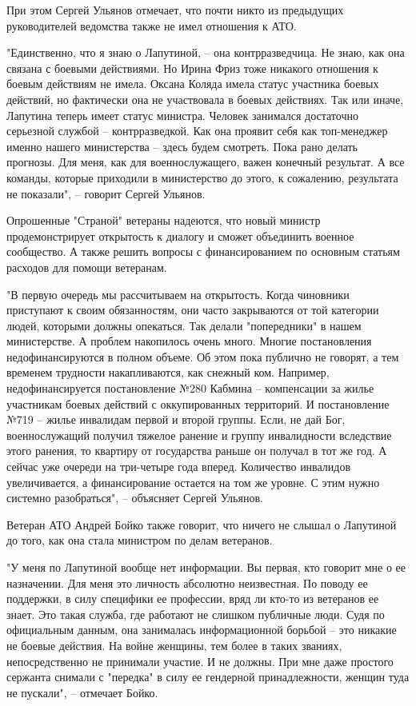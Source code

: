 При этом Сергей Ульянов отмечает, что почти никто из предыдущих руководителей
ведомства также не имел отношения к АТО.

"Единственно, что я знаю о Лапутиной, – она контрразведчица. Не знаю, как она
связана с боевыми действиями. Но Ирина Фриз тоже никакого отношения к боевым
действиям не имела. Оксана Коляда имела статус участника боевых действий, но
фактически она не участвовала в боевых действиях. Так или иначе, Лапутина
теперь имеет статус министра. Человек занимался достаточно серьезной службой –
контрразведкой. Как она проявит себя как топ-менеджер именно нашего
министерства – здесь будем смотреть. Пока рано делать прогнозы. Для меня, как
для военнослужащего, важен конечный результат. А все команды, которые приходили
в министерство до этого, к сожалению, результата не показали", – говорит Сергей
Ульянов.

Опрошенные "Страной" ветераны надеются, что новый министр продемонстрирует
открытость к диалогу и сможет объединить военное сообщество. А также решить
вопросы с финансированием по основным статьям расходов для помощи ветеранам.

"В первую очередь мы рассчитываем на открытость. Когда чиновники приступают к
своим обязанностям, они часто закрываются от той категории людей, которыми
должны опекаться. Так делали "попередники" в нашем министерстве. А проблем
накопилось очень много. Многие постановления недофинансируются в полном объеме.
Об этом пока публично не говорят, а тем временем трудности накапливаются, как
снежный ком. Например, недофинансируется постановление №280 Кабмина –
компенсации за жилье участникам боевых действий с оккупированных территорий. И
постановление №719 – жилье инвалидам первой и второй группы. Если, не дай Бог,
военнослужащий получил тяжелое ранение и группу инвалидности вследствие этого
ранения, то квартиру от государства раньше он получал в тот же год. А сейчас
уже очереди на три-четыре года вперед. Количество инвалидов увеличивается, а
финансирование остается на том же уровне. С этим нужно системно разобраться", –
объясняет Сергей Ульянов.

Ветеран АТО Андрей Бойко также говорит, что ничего не слышал о Лапутиной до
того, как она стала министром по делам ветеранов. 

"У меня по Лапутиной вообще нет информации. Вы первая, кто говорит мне о ее
назначении. Для меня это личность абсолютно неизвестная. По поводу ее
поддержки, в силу специфики ее профессии, вряд ли кто-то из ветеранов ее знает.
Это такая служба, где работают не слишком публичные люди. Судя по официальным
данным, она занималась информационной борьбой – это никакие не боевые действия.
На войне женщины, тем более в таких званиях, непосредственно не принимали
участие. И не должны. При мне даже простого сержанта снимали с "передка" в силу
ее гендерной принадлежности, женщин туда не пускали", – отмечает Бойко.

